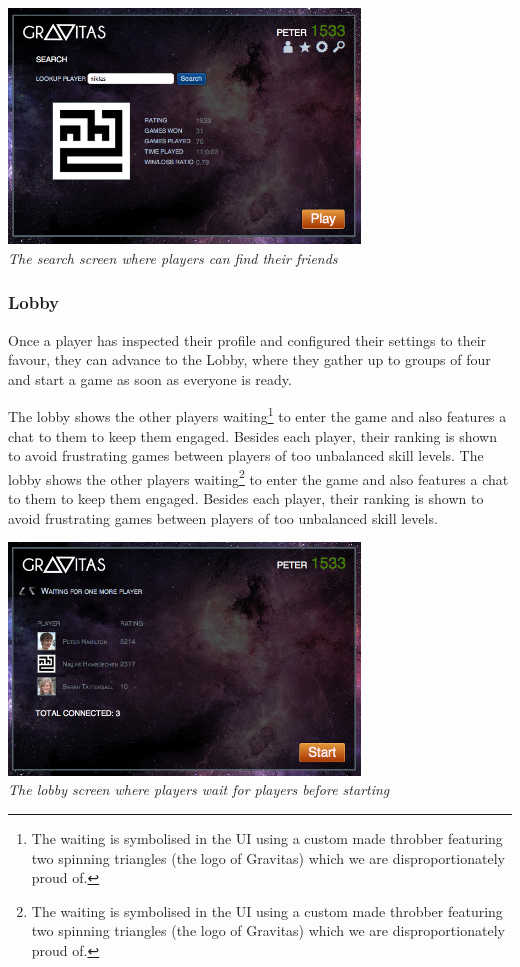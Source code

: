 \documentclass[a4wide, 11pt]{article}
\begin{document}
\begin{center}

  \includegraphics[width=0.7\textwidth]{images/search.png} \\
  \emph{The search screen where players can find their friends}
\end{center}

\subsubsection{Lobby}
Once a player has inspected their profile and configured their settings to their favour, they can advance to the Lobby, where they gather up to groups of four and start a game as soon as everyone is ready.

The lobby shows the other players waiting\footnote{The waiting is symbolised in the UI using a custom made throbber featuring two spinning triangles (the logo of Gravitas) which we are disproportionately proud of.} to enter the game and also features a chat to them to keep them engaged. Besides each player, their ranking is shown to avoid frustrating games between players of too unbalanced skill levels.
The lobby shows the other players waiting\footnote{The waiting is symbolised in the UI using a custom made throbber featuring two spinning triangles (the logo of Gravitas) which we are disproportionately proud of.} to enter the game and also features a chat to them to keep them engaged. Besides each player, their ranking is shown to avoid frustrating games between players of too unbalanced skill levels.


\begin{center}

    \includegraphics[width=0.7\textwidth]{images/lobby.png} \\
    \emph{The lobby screen where players wait for players before starting }
\end{center}
\end{document}
